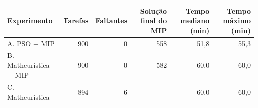 \begin{tabular}{lrrrrr}
\toprule
Experimento & Tarefas & Faltantes & Solução final do MIP & Tempo mediano (min) & Tempo máximo (min) \\
\midrule
A. PSO + MIP & 900 & 0 & 558 & 51,8 & 55,3 \\
B. Matheurística + MIP & 900 & 0 & 582 & 60,0 & 60,0 \\
C. Matheurística & 894 & 6 & -- & 60,0 & 60,0 \\
\bottomrule
\end{tabular}

